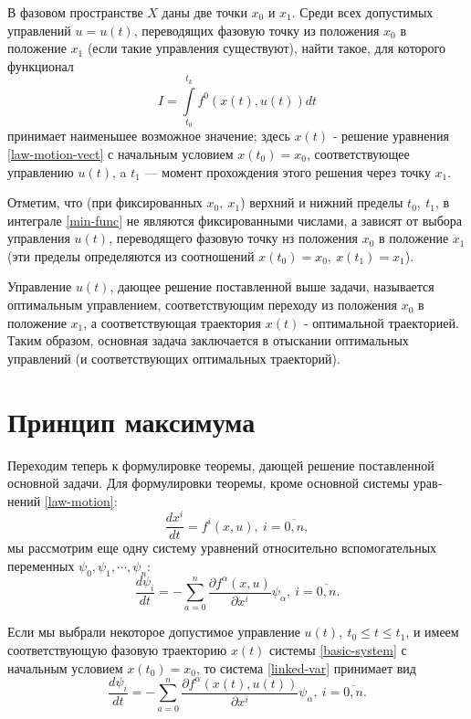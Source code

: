 \documentclass[14pt]{extreport}
\begin{document}
В фазовом пространстве $X$ даны две точки $x_0$ и $x_1$. Среди всех допустимых управлений $u=u(t)$, переводя­щих фазовую точку из положения $x_0$ в положение $x_1$ (если такие управления существуют), найти такое, для которого функционал
\begin{equation}
\label{min-func}
I=\int \limits_{t_0}^{t_k} f^0(x(t),u(t))dt
\end{equation}
принимает наименьшее возможное значение; здесь $x(t)$ - решение уравнения \eqref{law-motion-vect} с начальным условием $x(t_0)=x_0$, соответствующее управлению $u(t)$, a $t_1$ — момент прохождения этого решения через точку $x_1$.

Отметим, что (при фиксированных $x_0,\ x_1$) верхний и нижний пределы $t_0,\ t_1$, в интеграле \eqref{min-func} не являются фиксированными числами, а зависят от выбора управ­ления $u(t)$, переводящего фазовую точку нз положе­ния $x_0$ в положение $x_1$ (эти пределы определяются из соотношений $x(t_0)=x_0,\ x(t_1)=x_1$).

Управление $u(t)$, дающее решение поставленной выше задачи, называется оптимальным управлением, соответ­ствующим переходу из положения $x_0$ в положение $x_1$, а соответствующая траектория $x(t)$ - оптимальной тра­екторией. Таким образом, основная задача заключается в отыскании оптимальных управлений (и соответствую­щих оптимальных траекторий).

\section{Принцип максимума}
Переходим теперь к формулировке теоремы, дающей решение поставленной основной задачи. Для формулировки теоремы, кроме основной системы урав­нений \eqref{law-motion}:
\begin{equation}
\label{basic-system}
\dfrac{dx^i}{dt}=f^i(x,u),\ i=\overline{0,n},
\end{equation}
мы рассмотрим еще одну систему уравнений относительно вспомогательных переменных $\psi_0,\psi_1,\cdots,\psi_n$:
\begin{equation}
\label{linked-var}
\dfrac{d\psi_i}{dt}=-\sum\limits_{a=0}^{n}\dfrac{\partial f^{\alpha}(x,u)}{\partial x^i}\psi_{\alpha},\ i=\overline{0,n}.
\end{equation}

Если мы выбрали некоторое допустимое управление $u(t),\ t_0 \leq t \leq t_1$, и имеем соответствующую фазовую траекторию  $x(t)$ системы \eqref{basic-system} с начальным условием $x(t_0)=x_0$, то система \eqref{linked-var} принимает вид
\begin{equation}
\label{linked-var-2}
\dfrac{d\psi_i}{dt}=-\sum\limits_{a=0}^{n}\dfrac{\partial f^{\alpha}(x(t),u(t))}{\partial x^i}\psi_{\alpha},\ i=\overline{0,n}.
\end{equation}
\end{document}
